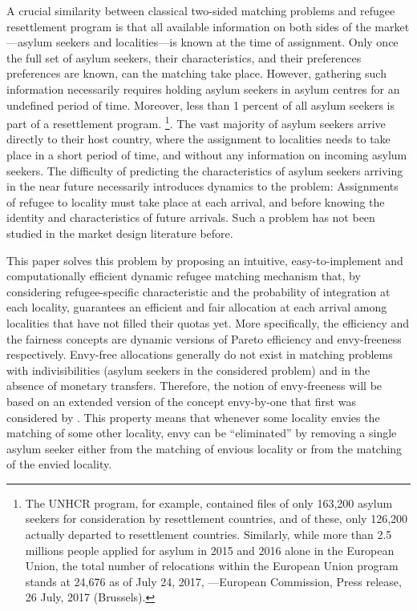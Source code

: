 \documentclass[12pt,fleqn]{article}
\begin{document}
A crucial similarity between classical two-sided matching problems and refugee resettlement program is that all available information on both sides of the market---asylum seekers and localities---is known at the time of assignment. Only once the full set of asylum seekers, their characteristics, and their preferences preferences are known, can the matching take place. However, gathering such information necessarily requires holding asylum seekers in asylum centres for an undefined period of time. Moreover, less than 1 percent of all asylum seekers is part of a resettlement program. \footnote{The UNHCR program, for example, contained files of only 163,200 asylum seekers for consideration by resettlement countries, and of these, only 126,200 actually departed to resettlement countries. Similarly, while more than 2.5 millions people applied for asylum in 2015 and 2016 alone in the European Union, the total number of relocations within the European Union program stands at 24,676 as of July 24, 2017, ---European Commission, Press release, 26 July, 2017 (Brussels).}. The vast majority of asylum seekers arrive directly to their host country, where the assignment to localities needs to take place in a short period of time, and without any information on incoming asylum seekers. The difficulty of predicting the characteristics of asylum seekers arriving in the near future necessarily introduces dynamics to the problem: Assignments of refugee to locality must take place at each arrival, and before knowing the identity and characteristics of future arrivals. Such a problem has not been studied in the market design literature before.

This paper solves this problem by proposing an intuitive, easy-to-implement and computationally efficient dynamic refugee matching mechanism that, by considering refugee-specific characteristic and the probability of integration at each locality, guarantees an efficient and fair allocation at each arrival among localities that have not filled their quotas yet. More specifically, the efficiency and the fairness concepts are dynamic versions of Pareto efficiency and envy-freeness \citep{bib:Foley} respectively. Envy-free allocations generally do not exist in matching problems with indivisibilities (asylum seekers in the considered problem) and in the absence of monetary transfers. Therefore, the notion of envy-freeness will be based on an extended version of the concept envy-by-one that first was considered by \citet{bib:Budish}. This property means that whenever some locality envies the matching of some other locality, envy can be ``eliminated'' by removing a single asylum seeker either from the matching of envious locality or from the matching of the envied locality.
\end{document}
